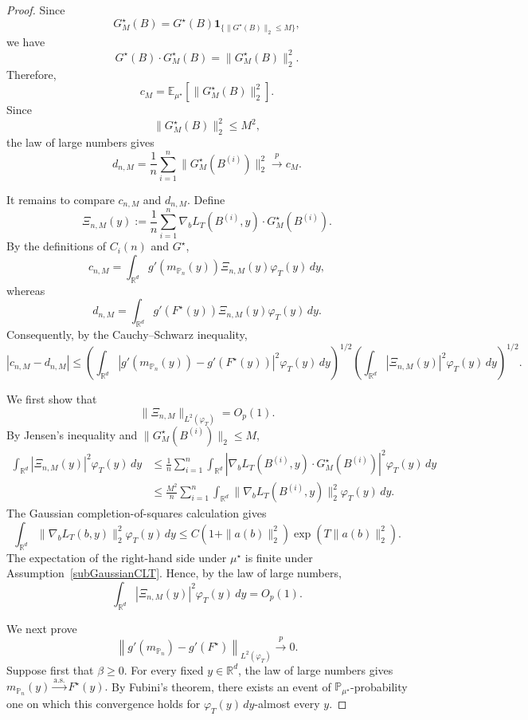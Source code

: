 \documentclass[11pt]{article}
\theoremstyle{definition}
\newcommand{\E}{\mathbb{E}}
\begin{document}
\begin{proof}
Since
\[
G_M^\star(B)
=
G^\star(B)
\mathbf 1_{\{\|G^\star(B)\|_2\leq M\}},
\]
we have
\[
G^\star(B)\cdot G_M^\star(B)
=
\|G_M^\star(B)\|_2^2.
\]
Therefore,
\[
c_M
=
\E_{\mu^\star}
\left[
\|G_M^\star(B)\|_2^2
\right].
\]
Since
\[
\|G_M^\star(B)\|_2^2\leq M^2,
\]
the law of large numbers gives
\[
d_{n,M}
=
\frac1n
\sum_{i=1}^n
\|G_M^\star(B^{(i)})\|_2^2
\xrightarrow{p}
c_M.
\]

It remains to compare $c_{n,M}$ and $d_{n,M}$. Define
\[
\Xi_{n,M}(y)
:=
\frac1n
\sum_{i=1}^n
\nabla_bL_T(B^{(i)},y)
\cdot
G_M^\star(B^{(i)}).
\]
By the definitions of $C_i(n)$ and $G^\star$,
\[
c_{n,M}
=
\int_{\mathbb R^d}
g'\!\left(m_{\mathbb P_n}(y)\right)
\Xi_{n,M}(y)
\varphi_T(y)\,dy,
\]
whereas
\[
d_{n,M}
=
\int_{\mathbb R^d}
g'\!\left(F^\star(y)\right)
\Xi_{n,M}(y)
\varphi_T(y)\,dy.
\]
Consequently, by the Cauchy--Schwarz inequality,
\begin{equation}\label{eq:cnM-dnM-bound}
|c_{n,M}-d_{n,M}|
\leq
\left(
\int_{\mathbb R^d}
\left|
g'\!\left(m_{\mathbb P_n}(y)\right)
-
g'\!\left(F^\star(y)\right)
\right|^2
\varphi_T(y)\,dy
\right)^{1/2}
\left(
\int_{\mathbb R^d}
|\Xi_{n,M}(y)|^2
\varphi_T(y)\,dy
\right)^{1/2}.
\end{equation}

We first show that
\[
\|\Xi_{n,M}\|_{L^2(\varphi_T)}
=
O_p(1).
\]
By Jensen's inequality and
$\|G_M^\star(B^{(i)})\|_2\leq M$,
\begin{align*}
\int_{\mathbb R^d}
|\Xi_{n,M}(y)|^2
\varphi_T(y)\,dy
&\leq
\frac1n
\sum_{i=1}^n
\int_{\mathbb R^d}
\left|
\nabla_bL_T(B^{(i)},y)
\cdot
G_M^\star(B^{(i)})
\right|^2
\varphi_T(y)\,dy
\\
&\leq
\frac{M^2}{n}
\sum_{i=1}^n
\int_{\mathbb R^d}
\|\nabla_bL_T(B^{(i)},y)\|_2^2
\varphi_T(y)\,dy.
\end{align*}
The Gaussian completion-of-squares calculation gives
\[
\int_{\mathbb R^d}
\|\nabla_bL_T(b,y)\|_2^2
\varphi_T(y)\,dy
\leq
C
\left(
1+\|a(b)\|_2^2
\right)
\exp\!\left(
T\|a(b)\|_2^2
\right).
\]
The expectation of the right-hand side under $\mu^\star$ is finite
under Assumption~\ref{subGaussianCLT}. Hence, by the law of large
numbers,
\[
\int_{\mathbb R^d}
|\Xi_{n,M}(y)|^2
\varphi_T(y)\,dy
=
O_p(1).
\]

We next prove
\begin{equation}\label{eq:gprime-mixture-convergence}
\left\|
g'\!\left(m_{\mathbb P_n}\right)
-
g'\!\left(F^\star\right)
\right\|_{L^2(\varphi_T)}
\xrightarrow{p}
0.
\end{equation}
Suppose first that $\beta\geq0$. For every fixed
$y\in\mathbb R^d$, the law of large numbers gives $m_{\mathbb P_n}(y)
\xrightarrow{\mathrm{a.s.}}
F^\star(y).$
By Fubini's theorem, there exists an event of
$\mathbb P_{\mu^\star}$-probability one on which this convergence
holds for $\varphi_T(y)\,dy$-almost every $y$.


\end{proof}
\end{document}
